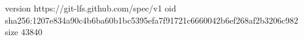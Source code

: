 version https://git-lfs.github.com/spec/v1
oid sha256:1207e834a90c4b6ba60b1bc5395efa7f91721c6660042b6ef268af2b3206c982
size 43840
